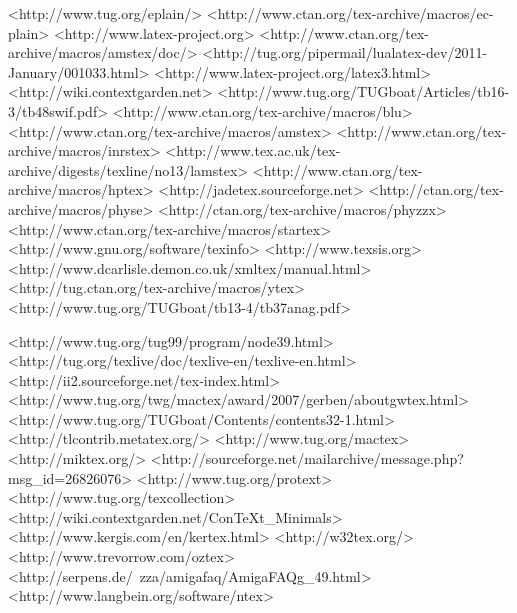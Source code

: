	<http://www.tug.org/eplain/>
	<http://www.ctan.org/tex-archive/macros/ec-plain>
	<http://www.latex-project.org>
	<http://www.ctan.org/tex-archive/macros/amstex/doc/>
	<http://tug.org/pipermail/lualatex-dev/2011-January/001033.html>
	<http://www.latex-project.org/latex3.html>
	<http://wiki.contextgarden.net>
	<http://www.tug.org/TUGboat/Articles/tb16-3/tb48swif.pdf>
	<http://www.ctan.org/tex-archive/macros/blu>
	<http://www.ctan.org/tex-archive/macros/amstex>
	<http://www.ctan.org/tex-archive/macros/inrstex>
	<http://www.tex.ac.uk/tex-archive/digests/texline/no13/lamstex>
	<http://www.ctan.org/tex-archive/macros/hptex>
	<http://jadetex.sourceforge.net>
	<http://ctan.org/tex-archive/macros/physe>
	<http://ctan.org/tex-archive/macros/phyzzx>
	<http://www.ctan.org/tex-archive/macros/startex>
	<http://www.gnu.org/software/texinfo>
	<http://www.texsis.org>
	<http://www.dcarlisle.demon.co.uk/xmltex/manual.html>
	<http://tug.ctan.org/tex-archive/macros/ytex>
	<http://www.tug.org/TUGboat/tb13-4/tb37anag.pdf>

	<http://www.tug.org/tug99/program/node39.html>
	<http://tug.org/texlive/doc/texlive-en/texlive-en.html>
	<http://ii2.sourceforge.net/tex-index.html>
	<http://www.tug.org/twg/mactex/award/2007/gerben/aboutgwtex.html>
	<http://www.tug.org/TUGboat/Contents/contents32-1.html>
	<http://tlcontrib.metatex.org/>
	<http://www.tug.org/mactex>
	<http://miktex.org/>
	<http://sourceforge.net/mailarchive/message.php?msg_id=26826076>
	<http://www.tug.org/protext>
	<http://www.tug.org/texcollection>
	<http://wiki.contextgarden.net/ConTeXt_Minimals>
	<http://www.kergis.com/en/kertex.html>
	<http://w32tex.org/>
	<http://www.trevorrow.com/oztex>
	<http://serpens.de/~zza/amigafaq/AmigaFAQg_49.html>
	<http://www.langbein.org/software/ntex>

